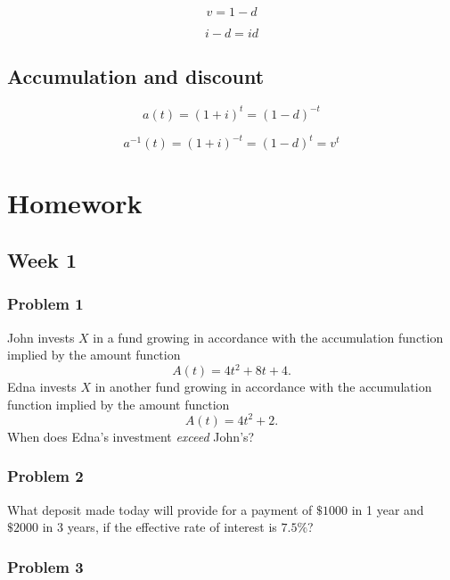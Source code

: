 \documentclass[
]{book}
\begin{document}
\[v=1-d\]

\[i-d=id\]

\hypertarget{accumulation-and-discount}{%
\subsection*{Accumulation and discount}\label{accumulation-and-discount}}

\[a(t)=(1+i)^t=(1-d)^{-t}\]

\[a^{-1}(t)=(1+i)^{-t}=(1-d)^t=v^t\]

\hypertarget{homework}{%
\section{Homework}\label{homework}}

\hypertarget{week-1}{%
\subsection*{Week 1}\label{week-1}}

\hypertarget{problem-1}{%
\subsubsection*{Problem 1}\label{problem-1}}

John invests \(X\) in a fund growing in accordance with the accumulation function implied by the amount function
\[A(t)=4t^2+8t+4.\]
Edna invests \(X\) in another fund growing in accordance with the accumulation function implied by the amount function \[A(t)=4t^2+2.\]
When does Edna's investment \emph{exceed} John's?

\hypertarget{problem-2}{%
\subsubsection*{Problem 2}\label{problem-2}}

What deposit made today will provide for a payment of \(\$1000\) in 1 year and \(\$2000\) in 3 years, if the effective rate of interest is \(7.5\%\)?

\hypertarget{problem-3}{%
\subsubsection*{Problem 3}\label{problem-3}}
\end{document}
